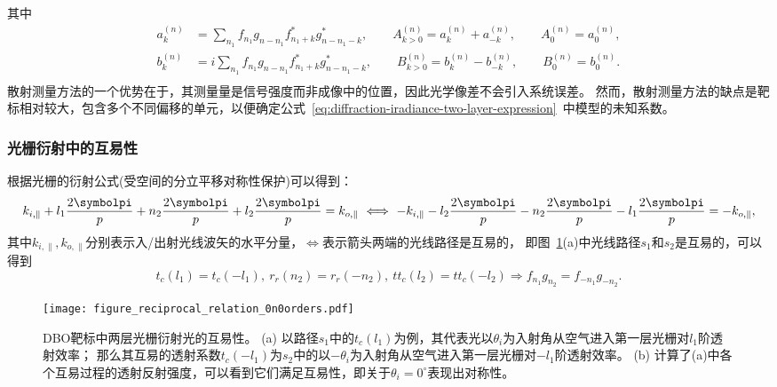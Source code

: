 其中
\begin{equation*}
\begin{aligned}
a_k^{(n)} &= \sum_{n_1} f_{n_1} g_{n-n_1} f_{n_1+k}^\ast g_{n-n_1-k}^\ast,
\qquad A_{k>0}^{(n)} = a_k^{(n)} + a_{-k}^{(n)}, \qquad A_0^{(n)} = a_0^{(n)}, \\
b_k^{(n)} &= i\sum_{n_1} f_{n_1} g_{n-n_1} f_{n_1+k}^\ast g_{n-n_1-k}^\ast, 
\qquad B_{k>0}^{(n)} = b_k^{(n)} - b_{-k}^{(n)}, \qquad B_0^{(n)} = b_0^{(n)}. \\
\end{aligned}
\end{equation*}
散射测量方法的一个优势在于，其测量量是信号强度而非成像中的位置，因此光学像差不会引入系统误差。
然而，散射测量方法的缺点是靶标相对较大，包含多个不同偏移的单元，以便确定公式~\eqref{eq:diffraction-iradiance-two-layer-expression}~中模型的未知系数。

\subsubsection{光栅衍射中的互易性~\label{光栅衍射中的互易性}}

根据光栅的衍射公式(受空间的分立平移对称性保护)可以得到：
\begin{equation*}
k_{i,\parallel} + l_1 \frac{2\symbolpi}{p} + n_2 \frac{2\symbolpi}{p}
+ l_2 \frac{2\symbolpi}{p} = k_{o,\parallel} ~\Longleftrightarrow~
-k_{i,\parallel} - l_2 \frac{2\symbolpi}{p} - n_2 \frac{2\symbolpi}{p}
- l_1 \frac{2\symbolpi}{p} = -k_{o,\parallel},
\end{equation*}
其中$k_{i,\parallel},k_{o,\parallel}$分别表示入/出射光线波矢的水平分量，$\Longleftrightarrow$表示箭头两端的光线路径是互易的，
即图~\ref{fig:reciprocal-relation-0n0orders}(a)中光线路径$s_1$和$s_2$是互易的，可以得到
\begin{equation}\label{eq:reciprocal-relation}
t_c(l_1)=t_c(-l_1),~
r_r(n_2)=r_r(-n_2),~
tt_c(l_2)=tt_c(-l_2)
\Longrightarrow 
f_{n_1}g_{n_2} = f_{-n_1}g_{-n_2}.
\end{equation}

\begin{figure}[t]
\centering
\texttt{[image: figure\_reciprocal\_relation\_0n0orders.pdf]}
\caption{DBO靶标中两层光栅衍射光的互易性。
(a) 以路径$s_1$中的$t_c(l_1)$为例，其代表光以$\theta_i$为入射角从空气进入第一层光栅对$l_1$阶透射效率；
那么其互易的透射系数$t_c(-l_1)$为$s_2$中的以$-\theta_i$为入射角从空气进入第一层光栅对$-l_1$阶透射效率。
(b) 计算了(a)中各个互易过程的透射反射强度，可以看到它们满足互易性，即关于$\theta_i=0^\circ$表现出对称性。}
\label{fig:reciprocal-relation-0n0orders}
\end{figure}

